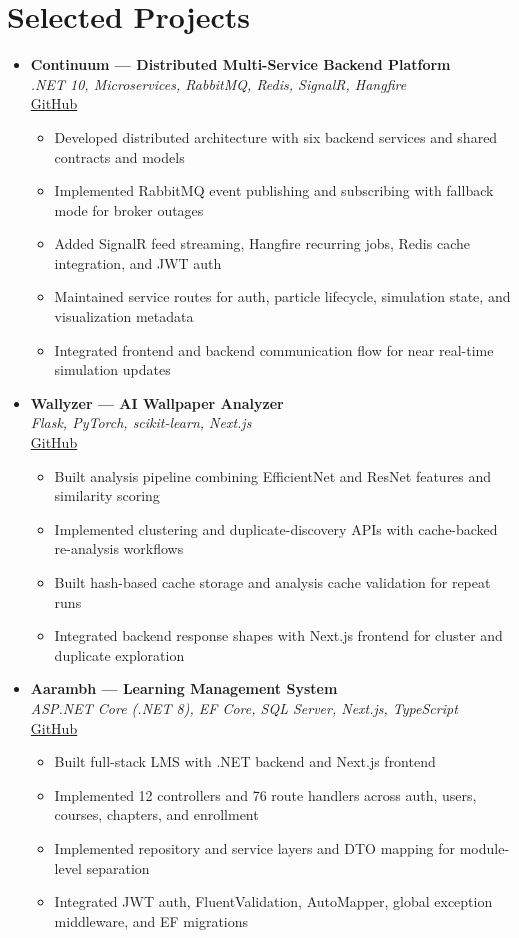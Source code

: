 \documentclass[11pt,a4paper]{article}
\newcommand{\resumeItem}[1]{
  \item\small{#1 \vspace{-1pt}}
}
\begin{document}
\section{Selected Projects}
\begin{itemize}[leftmargin=*]

\item \textbf{Continuum --- Distributed Multi-Service Backend Platform} \\
\textit{.NET 10, Microservices, RabbitMQ, Redis, SignalR, Hangfire} \\
\href{https://github.com/Dhairya3391/continuum}{GitHub}
\begin{itemize}[leftmargin=*]
  \resumeItem{Developed distributed architecture with six backend services and shared contracts and models}
  \resumeItem{Implemented RabbitMQ event publishing and subscribing with fallback mode for broker outages}
  \resumeItem{Added SignalR feed streaming, Hangfire recurring jobs, Redis cache integration, and JWT auth}
  \resumeItem{Maintained service routes for auth, particle lifecycle, simulation state, and visualization metadata}
  \resumeItem{Integrated frontend and backend communication flow for near real-time simulation updates}
\end{itemize}

\item \textbf{Wallyzer --- AI Wallpaper Analyzer} \\
\textit{Flask, PyTorch, scikit-learn, Next.js} \\
\href{https://github.com/Dhairya3391/wallyzer}{GitHub}
\begin{itemize}[leftmargin=*]
  \resumeItem{Built analysis pipeline combining EfficientNet and ResNet features and similarity scoring}
  \resumeItem{Implemented clustering and duplicate-discovery APIs with cache-backed re-analysis workflows}
  \resumeItem{Built hash-based cache storage and analysis cache validation for repeat runs}
  \resumeItem{Integrated backend response shapes with Next.js frontend for cluster and duplicate exploration}
\end{itemize}

\item \textbf{Aarambh --- Learning Management System} \\
\textit{ASP.NET Core (.NET 8), EF Core, SQL Server, Next.js, TypeScript} \\
\href{https://github.com/Dhairya3391/Aarambh}{GitHub}
\begin{itemize}[leftmargin=*]
  \resumeItem{Built full-stack LMS with .NET backend and Next.js frontend}
  \resumeItem{Implemented 12 controllers and 76 route handlers across auth, users, courses, chapters, and enrollment}
  \resumeItem{Implemented repository and service layers and DTO mapping for module-level separation}
  \resumeItem{Integrated JWT auth, FluentValidation, AutoMapper, global exception middleware, and EF migrations}
\end{itemize}


\end{itemize}
\end{document}
